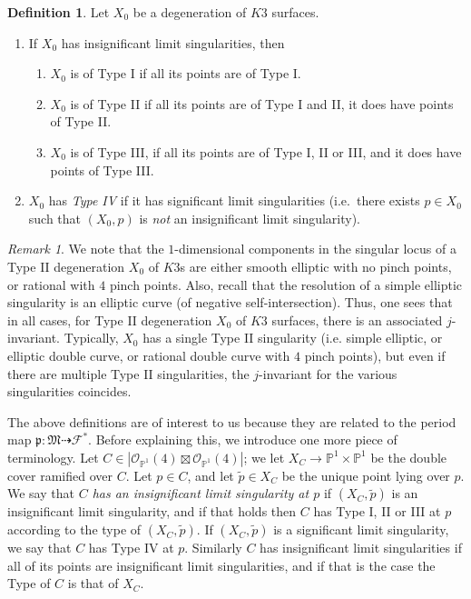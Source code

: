 \documentclass[11pt]{amsart}
\numberwithin{equation}{section}
\theoremstyle{plain}
\theoremstyle{remark}
\newtheorem{remark}[theorem]{Remark}
\theoremstyle{definition}
\newtheorem{definition}[theorem]{Definition}
\newcommand{\sF}{\mathscr{F}}
\newcommand{\gp}{\mathfrak{p}}
\newcommand{\cO}{{\mathscr O}}
\newcommand{\dra}{\dashrightarrow}
\newcommand{\gM}{\mathfrak{M}}
\newcommand{\PP}{{\mathbb P}}
\newcommand{\wt}{\widetilde}
\begin{document}
\begin{definition}
%
Let $X_0$ be a degeneration of $K3$ surfaces. 
%
\begin{enumerate}
%
\item 
If $X_0$  has  insignificant limit singularities, then  
%
\begin{enumerate}
%
\item  $X_0$ is of Type I if all its points are of Type I.
%
\item   $X_0$ is of Type II if all its points are of Type I and II, it does have points of Type II.
\item $X_0$ is of Type III,  if all its points are of Type I, II or III, and  it does have points of Type III. 
% 
\end{enumerate}
%
\item
%
 $X_0$ has \emph{Type IV} if it has  significant  limit  singularities (i.e.~there exists $p\in X_0$ such that $(X_0,p)$ is  \emph{not} an   insignificant limit singularity).
%
\end{enumerate}
%
\end{definition}

\begin{remark}\label{rmk:jinv}
We note that the $1$-dimensional components in the singular locus of a Type II degeneration $X_0$ of $K3$s are either  smooth elliptic with no pinch points, or rational with $4$ pinch points. Also, recall that the resolution of a simple elliptic singularity is an elliptic curve (of negative self-intersection). Thus, one sees that in all cases, for Type II degeneration $X_0$ of $K3$ surfaces, there is an associated $j$-invariant. Typically, $X_0$ has a single Type II singularity (i.e. simple elliptic, or elliptic double curve, or rational double curve with $4$ pinch points), but even if there are multiple Type II singularities, the $j$-invariant for the various singularities coincides. 
\end{remark}
%
The above definitions are of interest to us because they are related to the period map $\gp\colon\gM\dra\sF^{*}$.
Before explaining this, we introduce one more piece of terminology. Let $C\in|\cO_{\PP^1}(4)\boxtimes\cO_{\PP^1}(4)|$; we let $X_C\to \PP^1\times\PP^1$ be the double cover ramified over $C$. Let  $p\in C$, and let $
\wt{p}\in X_C$ be the unique point lying over $p$.
We say that \emph{$C$ has an insignificant limit singularity at $p$} if $(X_C,\wt{p})$ is an insignificant limit singularity, and if that holds then $C$ has Type I, II or III at $p$ according to the type of $(X_C,\wt{p})$. If   $(X_C,\wt{p})$ is a significant limit singularity, we say that $C$ has Type IV at $p$. Similarly $C$ has insignificant limit singularities if all of its points are insignificant limit singularities, and if that is the case the Type of $C$ is that of $X_C$. 
\end{document}
